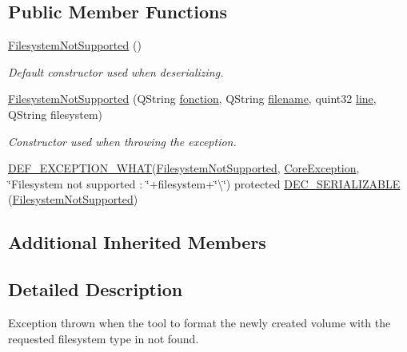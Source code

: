\subsection*{Public Member Functions}
\begin{DoxyCompactItemize}
\item 
\hyperlink{class_gost_crypt_1_1_core_1_1_filesystem_not_supported_a2f4c9f5a5a5121bb4102226eddd07b47}{Filesystem\+Not\+Supported} ()
\begin{DoxyCompactList}\small\item\em Default constructor used when deserializing. \end{DoxyCompactList}\item 
\hyperlink{class_gost_crypt_1_1_core_1_1_filesystem_not_supported_ad6b2275e69d9d0e541abbb44631e53be}{Filesystem\+Not\+Supported} (Q\+String \hyperlink{class_gost_crypt_1_1_gost_crypt_exception_a29b8c93d5efbb1ff369107385725a939}{fonction}, Q\+String \hyperlink{class_gost_crypt_1_1_gost_crypt_exception_a749a12375f4ba9d502623b99d8252f38}{filename}, quint32 \hyperlink{class_gost_crypt_1_1_gost_crypt_exception_abf506d911f12a4e969eea500f90bd32c}{line}, Q\+String filesystem)
\begin{DoxyCompactList}\small\item\em Constructor used when throwing the exception. \end{DoxyCompactList}\item 
\hyperlink{_gost_crypt_exception_8h_a5bc1e1c6c9d6f46c84eeba49e33355f9}{D\+E\+F\+\_\+\+E\+X\+C\+E\+P\+T\+I\+O\+N\+\_\+\+W\+H\+AT}(\hyperlink{class_gost_crypt_1_1_core_1_1_filesystem_not_supported}{Filesystem\+Not\+Supported}, \hyperlink{class_gost_crypt_1_1_core_1_1_core_exception}{Core\+Exception}, \char`\"{}Filesystem not supported \+: \char`\"{}+filesystem+\char`\"{}\textbackslash{}\char`\"{}) protected \hyperlink{class_gost_crypt_1_1_core_1_1_filesystem_not_supported_a883ac5291e422414ed4fac3b6dda815a}{D\+E\+C\+\_\+\+S\+E\+R\+I\+A\+L\+I\+Z\+A\+B\+LE} (\hyperlink{class_gost_crypt_1_1_core_1_1_filesystem_not_supported}{Filesystem\+Not\+Supported})
\end{DoxyCompactItemize}
\subsection*{Additional Inherited Members}


\subsection{Detailed Description}
Exception thrown when the tool to format the newly created volume with the requested filesystem type in not found. 

